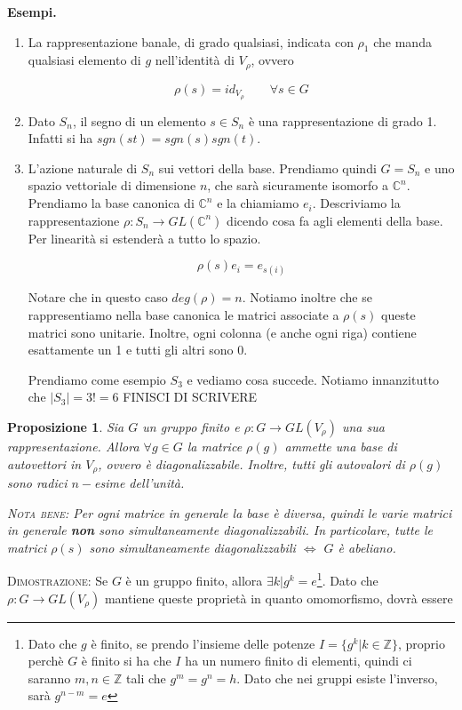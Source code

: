\documentclass[11pt]{article}
\theoremstyle{plain}
\newtheorem{prop}[thm]{Proposizione}
\theoremstyle{definition}
\theoremstyle{remark}
\newcommand{\C}{\mathbb{C}}
\begin{document}
\textbf{Esempi.}
\begin{enumerate}
	\item La rappresentazione banale, di grado qualsiasi, indicata con $\rho_1$ che manda qualsiasi elemento di $g$ nell'identità di $V_\rho$, ovvero
	
	\[ \rho(s ) = id_{V_\rho} \qquad \forall s \in G\]
	\item Dato $S_n$, il segno di un elemento $s\in S_n$ è una rappresentazione di grado 1. Infatti si ha $sgn(st) = sgn(s) sgn(t)$.
	\item L'azione naturale di $S_n$ sui vettori della base. Prendiamo quindi $G = S_n$ e uno spazio vettoriale di dimensione $n$, che sarà sicuramente isomorfo a $\C^n$. Prendiamo la base canonica di $\C^n$ e la chiamiamo $e_i$. Descriviamo la rappresentazione $\rho: S_n \to GL(\C^n)$ dicendo cosa fa agli elementi della base. Per linearità si estenderà a tutto lo spazio.
	
	\[ \rho(s) e_i = e_{s(i)}\]
	
	Notare che in questo caso $deg(\rho) = n$. Notiamo inoltre che se rappresentiamo nella base canonica le matrici associate a $\rho(s)$ queste matrici sono unitarie. Inoltre, ogni colonna (e anche ogni riga) contiene esattamente un 1 e tutti gli altri sono 0.
	
	Prendiamo come esempio $S_3$ e vediamo cosa succede. Notiamo innanzitutto che $ |S_3| = 3! = 6$
	FINISCI DI SCRIVERE
\end{enumerate}








\begin{prop}
Sia $G$ un gruppo finito e $\rho: G \to GL(V_\rho)$ una sua rappresentazione. Allora $\forall g \in G$ la matrice $\rho(g)$ ammette una base di autovettori in $V_\rho$, ovvero è diagonalizzabile. Inoltre, tutti gli autovalori di $\rho(g)$ sono radici $n-$esime dell'unità.

\textsc{Nota bene:} Per ogni matrice in generale la base è diversa, quindi le varie matrici in generale \textbf{non} sono simultaneamente diagonalizzabili. In particolare, tutte le matrici $\rho(s)$ sono simultaneamente diagonalizzabili $\Leftrightarrow$ $G$ è abeliano. 

\label{prop:diagonalizzabilita rappresentazioni}
\end{prop}

\textsc{Dimostrazione:} Se $G$ è un gruppo finito, allora $\exists k | g^k = e$\footnote{Dato che $g$ è finito, se prendo l'insieme delle potenze $I = \{g^k| k\in \mathbb{Z}\}$, proprio perchè $G$ è finito si ha che $I$ ha un numero finito di elementi, quindi ci saranno $m,n \in \mathbb{Z}$ tali che $g^m = g^n = h$. Dato che nei gruppi esiste l'inverso, sarà $g^{n-m} = e$}. Dato che $\rho:G\to GL(V_\rho)$ mantiene queste proprietà in quanto omomorfismo, dovrà essere
\end{document}
